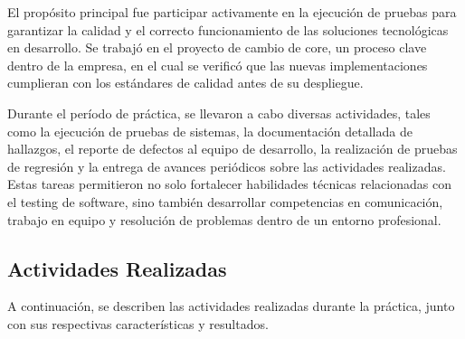 \documentclass[12pt,a4paper]{report}
\begin{document}
El propósito principal fue participar activamente en la ejecución de pruebas para garantizar la calidad y el correcto funcionamiento de las soluciones tecnológicas en desarrollo. Se trabajó en el proyecto de cambio de core, un proceso clave dentro de la empresa, en el cual se verificó que las nuevas implementaciones cumplieran con los estándares de calidad antes de su despliegue.

Durante el período de práctica, se llevaron a cabo diversas actividades, tales como la ejecución de pruebas de sistemas, la documentación detallada de hallazgos, el reporte de defectos al equipo de desarrollo, la realización de pruebas de regresión y la entrega de avances periódicos sobre las actividades realizadas. Estas tareas permitieron no solo fortalecer habilidades técnicas relacionadas con el testing de software, sino también desarrollar competencias en comunicación, trabajo en equipo y resolución de problemas dentro de un entorno profesional.

\subsection{Actividades Realizadas}

A continuación, se describen las actividades realizadas durante la práctica, junto con sus respectivas características y resultados.
\end{document}
